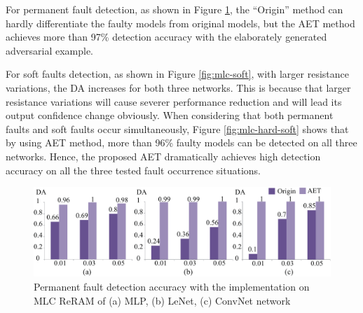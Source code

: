For permanent fault detection, as shown in Figure \ref{fig:mlc-hard}, the ``Origin'' method can hardly differentiate the faulty models from original models, but the AET method achieves more than 97\% detection accuracy with the elaborately generated adversarial example.  

For soft faults detection, as shown in Figure \ref{fig:mlc-soft}, with larger resistance variations, the DA increases for both three networks. This is because that larger resistance variations will cause severer performance reduction and will lead its output confidence change obviously.  
When considering that both permanent faults and soft faults occur simultaneously, Figure \ref{fig:mlc-hard-soft} shows that by using AET method, more than 96\% faulty models can be detected on all three networks. Hence, the proposed AET  dramatically achieves high detection accuracy on all the three tested fault occurrence situations.


\begin{figure}
    \centering
    \includegraphics[width=0.75\linewidth]{images/OL-fig11}
    \caption{Permanent fault detection accuracy with the implementation on MLC ReRAM of (a) MLP, (b) LeNet, (c) ConvNet network}
    \label{fig:mlc-hard}
    \vspace{-10pt}
\end{figure}

